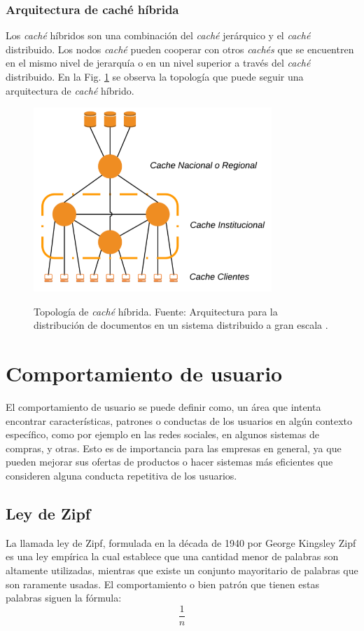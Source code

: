 \documentclass[12pt]{ociamthesis}  %
\begin{document}
\subsubsection{Arquitectura de caché híbrida}
Los \textit{caché} híbridos son una combinación del \textit{caché} jerárquico y el \textit{caché} distribuido. Los nodos \textit{caché} pueden cooperar con otros \textit{cachés} que se encuentren en el mismo nivel de jerarquía o en un nivel superior a través del \textit{caché} distribuido. En la Fig. \ref{topologia_cache_hibrido} se observa la topología que puede seguir una arquitectura de \textit{caché} híbrido.

\begin{figure}[!htb]
	\centering
	\includegraphics[width=9cm]{Imagenes/Topologia_cache_hibrida}\\
	\caption{Topología de \textit{caché} híbrida. Fuente: Arquitectura para la distribución de documentos en un sistema distribuido a gran escala \cite{sosa2002arquitectura}.}
	\label{topologia_cache_hibrido}
\end{figure}

\pagebreak
\section{Comportamiento de usuario}

El comportamiento de usuario se puede definir como, un área que intenta encontrar características, patrones o conductas de los usuarios en algún contexto específico, como por ejemplo en las redes sociales, en algunos sistemas de compras, y otras. Esto es de importancia para las empresas en general, ya que pueden mejorar sus ofertas de productos o hacer sistemas más eficientes que consideren alguna conducta repetitiva de los usuarios.

\subsection{Ley de Zipf}
La llamada ley de Zipf, formulada en la década de 1940 por George Kingsley Zipf \cite{zipf2013psycho}\cite{zipf2016human} es una ley empírica la cual establece que una cantidad menor de palabras son altamente utilizadas, mientras que existe un conjunto mayoritario de palabras que son raramente usadas. El comportamiento o bien patrón que tienen estas palabras siguen la fórmula:\\
\begin{equation}
\frac{1}{n}
\end{equation}\\
\end{document}
